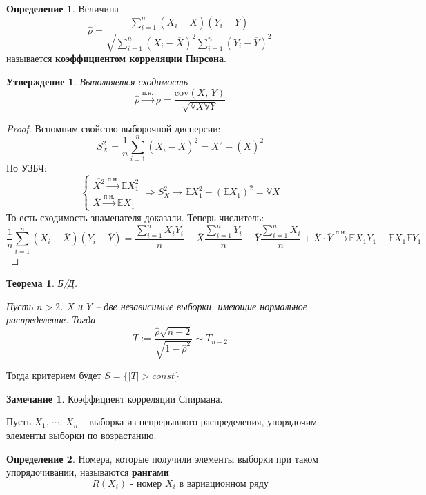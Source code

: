 \documentclass[a4paper,12pt]{article}
\theoremstyle{plain}
\newtheorem{theorem}{Теорема}[section]
\newtheorem{proposition}{Утверждение}[section]
\theoremstyle{definition}
\newtheorem{definition}{Определение}[section]
\newtheorem*{note}{Замечание}
\theoremstyle{remark}
\begin{document}
\begin{definition}
  Величина
  \[
    \hat{\rho} = \frac{\sum_{i = 1}^n(X_i - \overline{X})(Y_i - \overline{Y})}{\sqrt{\sum_{i = 1}^n(X_i - \overline{X})^2\sum_{i = 1}^n(Y_i - \overline{Y})^2}}
  \]
  называется \textbf{коэффициентом корреляции Пирсона}.
\end{definition}

\begin{proposition}
  Выполняется сходимость
  \[
    \hat{\rho} \overset{\text{п.н.}}{\to} \rho = \frac{\text{cov}(X,\,Y)}{\sqrt{\mathbb{V}X\mathbb{V}Y}}
  \]
\end{proposition}

\begin{proof}
  Вспомним свойство выборочной дисперсии:
  \[
    S_X^2 = \frac{1}{n}\sum_{i = 1}^n(X_i - \overline{X})^2 = \overline{X^2} - (\overline{X})^2
  \]
  По УЗБЧ:
  \[
    \begin{cases}
      \overline{X^2} \overset{\text{п.н.}}{\to} \mathbb{E}X_1^2\\
      \overline{X} \overset{\text{п.н.}}{\to} \mathbb{E}X_1
    \end{cases} \Rightarrow S_X^2 \to \mathbb{E}X_1^2 - (\mathbb{E}X_1)^2 = \mathbb{V}X
  \]
  То есть сходимость знаменателя доказали. Теперь числитель:
  \[
    \frac{1}{n}\sum_{i = 1}^n(X_i - \overline{X})(Y_i - \overline{Y}) = \frac{\sum_{i=1}^nX_iY_i}{n} - \overline{X}\frac{\sum_{i = 1}^nY_i}{n} - \overline{Y}\frac{\sum_{i = 1}^nX_i}{n} + \overline{X}\cdot\overline{Y} \overset{\text{п.н.}}{\to} \mathbb{E}X_1Y_1 - \mathbb{E}X_1\mathbb{E}Y_1
  \]
\end{proof}

\begin{theorem}
  Б/Д.

  Пусть $n > 2$. $X$ и $Y$ -- две независимые выборки, имеющие нормальное распределение. Тогда
  \[
    T := \frac{\hat{\rho}\sqrt{n - 2}}{\sqrt{1 - \hat{\rho}^2}} \sim T_{n - 2}
  \]
\end{theorem}

Тогда критерием будет $S = \{\vert T\vert > const\}$

\begin{note}
  Коэффициент корреляции Спирмана.

  Пусть $X_1,\,\cdots,\,X_n$ -- выборка из непрерывного распределения, упорядочим элементы выборки по возрастанию.
\end{note}

\begin{definition}
  Номера, которые получили элементы выборки при таком упорядочивании, называются \textbf{рангами}
  \[
    R(X_i) \text{ - номер }X_i\text{ в вариационном ряду}
  \]
\end{definition}
\end{document}
